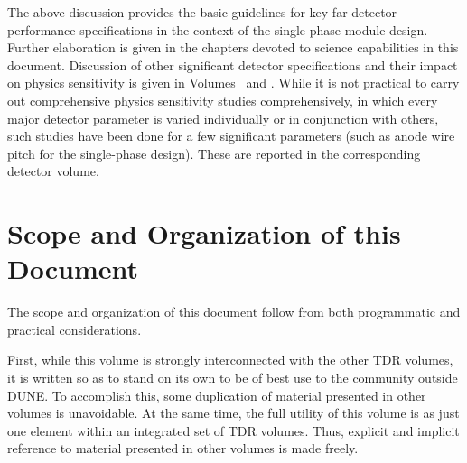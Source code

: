 The above discussion provides the basic guidelines for key far 
detector performance specifications in the context of the 
single-phase module design.  Further elaboration is given in the 
chapters devoted to science capabilities in this document.  
Discussion of other significant detector specifications 
and their impact on 
physics sensitivity is given in Volumes~\volnumbersp{} and 
\volnumberdp{}.  While it is not practical to carry out 
comprehensive physics sensitivity studies comprehensively, in 
which every major detector parameter is varied individually or 
in conjunction with others, such studies have been done 
for a few significant parameters (such as anode wire pitch for 
the single-phase \lartpc design).  These are reported in the 
corresponding detector volume.







\section{Scope and Organization of this Document}
\label{sec:exec-scope}

The scope and organization of this document follow from
both programmatic and practical considerations.

First, while this volume is strongly interconnected with
the other TDR volumes, it is written so as to stand on its
own %
to be of best use to the
community outside DUNE.  To accomplish this, some duplication
of material presented in other volumes is unavoidable.
At the same time, the full utility of this volume
is as just one element within an integrated set of TDR volumes.
Thus, explicit and implicit reference
to material presented in other volumes is made freely.


